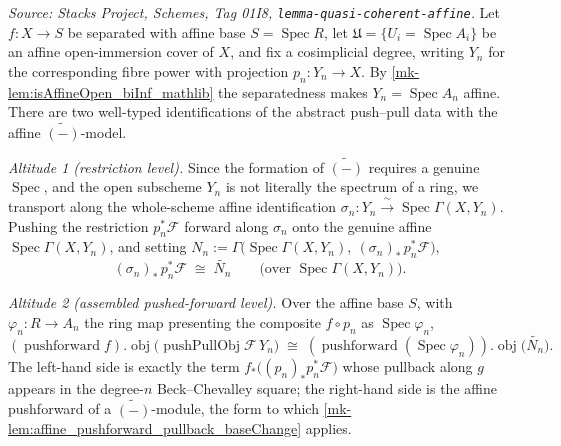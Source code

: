 \begin{lemma}
  \label{mk-lem:pushPullObj_iso_tilde}

  \textit{Source: Stacks Project, Schemes, Tag 01I8, \texttt{lemma-quasi-coherent-affine}.}
  Let \(f : X \to S\) be separated with affine base \(S = \operatorname{Spec} R\), let
  \(\mathfrak{U} = \{U_i = \operatorname{Spec} A_i\}\) be an affine open-immersion cover of
  \(X\), and fix a cosimplicial degree, writing \(Y_n\) for the corresponding fibre power
  with projection \(p_n : Y_n \to X\). By \ref{mk-lem:isAffineOpen_biInf_mathlib} the
  separatedness makes \(Y_n = \operatorname{Spec} A_n\) affine. There are two well-typed
  identifications of the abstract push--pull data with the affine \(\widetilde{(-)}\)-model.

  \emph{Altitude 1 (restriction level).} Since the formation of \(\widetilde{(-)}\) requires a
  genuine \(\operatorname{Spec}\), and the open subscheme \(Y_n\) is not literally the spectrum
  of a ring, we transport along the whole-scheme affine identification
  \(\sigma_n : Y_n \xrightarrow{\ \sim\ } \operatorname{Spec}\Gamma(X, Y_n)\). Pushing the
  restriction \(p_n^*\mathcal{F}\) forward along \(\sigma_n\) onto the genuine affine
  \(\operatorname{Spec}\Gamma(X, Y_n)\), and setting
  \(N_n := \Gamma\bigl(\operatorname{Spec}\Gamma(X, Y_n),\ (\sigma_n)_*\,p_n^*\mathcal{F}\bigr)\),
  \[
    (\sigma_n)_*\,p_n^*\mathcal{F} \;\cong\; \widetilde{N_n}
    \qquad\text{(over } \operatorname{Spec}\Gamma(X, Y_n)\text{).}
  \]

  \emph{Altitude 2 (assembled pushed-forward level).} Over the affine base \(S\), with
  \(\varphi_n : R \to A_n\) the ring map presenting the composite \(f \circ p_n\) as
  \(\operatorname{Spec}\varphi_n\),
  \[
    (\operatorname{pushforward} f).\!\operatorname{obj}\bigl(\operatorname{pushPullObj}
      \mathcal{F}\, Y_n\bigr)
    \;\cong\;
    (\operatorname{pushforward}(\operatorname{Spec}\varphi_n)).\!\operatorname{obj}\bigl(
      \widetilde{N_n}\bigr).
  \]
  The left-hand side is exactly the term \(f_*\bigl((p_n)_* p_n^*\mathcal{F}\bigr)\) whose
  pullback along \(g\) appears in the degree-\(n\) Beck--Chevalley square; the right-hand
  side is the affine pushforward of a \(\widetilde{(-)}\)-module, the form to which
  \ref{mk-lem:affine_pushforward_pullback_baseChange} applies.
\end{lemma}
